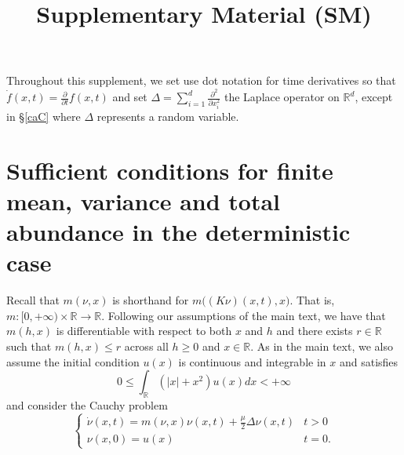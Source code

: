 \documentclass[]{article}
\title{Supplementary Material (SM)}
\author{}
\date{\vspace{-2.5em}}
\begin{document}
\maketitle

Throughout this supplement, we set use dot notation for time derivatives
so that \(\dot f(x,t)=\frac{\partial }{\partial t}f(x,t)\) and set
\(\Delta=\sum_{i=1}^d\frac{\partial^2}{\partial x_i^2}\) the Laplace
operator on \(\mathbb{R}^d\), except in \S\ref{caC} where \(\Delta\)
represents a random variable.

\hypertarget{sufficient-conditions-for-finite-mean-variance-and-total-abundance-in-the-deterministic-case}{%
\section{\texorpdfstring{Sufficient conditions for finite mean, variance
and total abundance in the deterministic case
\label{finite}}{Sufficient conditions for finite mean, variance and total abundance in the deterministic case }}\label{sufficient-conditions-for-finite-mean-variance-and-total-abundance-in-the-deterministic-case}}

Recall that \(m(\nu,x)\) is shorthand for \(m\big((K\nu)(x,t),x\big)\).
That is, \(m:[0,+\infty)\times\mathbb{R}\to\mathbb{R}\). Following our
assumptions of the main text, we have that \(m(h,x)\) is differentiable
with respect to both \(x\) and \(h\) and there exists \(r\in\mathbb{R}\)
such that \(m(h,x)\leq r\) across all \(h\geq0\) and \(x\in\mathbb{R}\).
As in the main text, we also assume the initial condition \(u(x)\) is
continuous and integrable in \(x\) and satisfies \begin{equation}
0\leq\int_{\mathbb{R}}(|x|+x^2)u(x)dx<+\infty
\end{equation} and consider the Cauchy problem
\begin{equation}\label{PDE_SM}
\left\{\begin{matrix}
\dot\nu(x,t)=m(\nu,x)\nu(x,t)+\frac{\mu}{2}\Delta\nu(x,t) & t>0\\
\nu(x,0)=u(x) & t=0.
\end{matrix}\right.
\end{equation}
\end{document}
